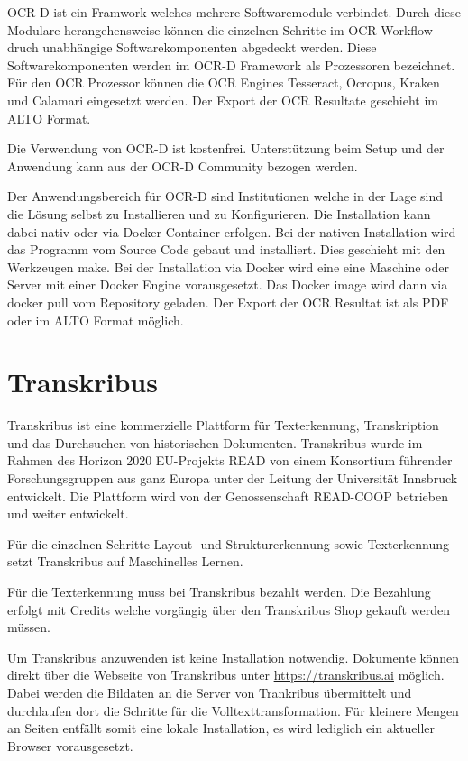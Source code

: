 \documentclass[a4paper,oneside, 12pt]{report}
\begin{document}
OCR-D ist ein Framwork welches mehrere Softwaremodule verbindet. Durch diese Modulare herangehensweise können die einzelnen Schritte im OCR Workflow druch unabhängige Softwarekomponenten abgedeckt werden. Diese Softwarekomponenten werden im OCR-D Framework als Prozessoren bezeichnet. Für den \ac{OCR} Prozessor können die OCR Engines Tesseract, Ocropus, Kraken und Calamari eingesetzt werden. Der Export der OCR Resultate geschieht im ALTO Format.

Die Verwendung von OCR-D ist kostenfrei. Unterstützung beim Setup und der Anwendung kann aus der OCR-D Community bezogen werden. 

Der Anwendungsbereich für OCR-D sind Institutionen welche in der Lage sind die Lösung selbst zu Installieren und zu Konfigurieren. Die Installation kann dabei nativ oder via Docker Container erfolgen. Bei der nativen Installation wird das Programm vom Source Code gebaut und installiert. Dies geschieht mit den Werkzeugen make. Bei der Installation via Docker wird eine eine Maschine oder Server mit einer Docker Engine vorausgesetzt. Das Docker image wird dann via docker pull vom Repository geladen. Der Export der OCR Resultat ist als PDF oder im ALTO Format möglich.
\section{Transkribus}
Transkribus ist eine kommerzielle Plattform für Texterkennung, Transkription und das Durchsuchen von historischen Dokumenten. Transkribus wurde im Rahmen des Horizon 2020 EU-Projekts READ von einem Konsortium führender Forschungsgruppen aus ganz Europa unter der Leitung der Universität Innsbruck entwickelt. Die Plattform wird von der Genossenschaft READ-COOP betrieben und weiter entwickelt. \cite{readcoopabout} 

Für die einzelnen Schritte Layout- und Strukturerkennung sowie Texterkennung setzt Transkribus auf Maschinelles Lernen. \cite{transkribus}

Für die Texterkennung muss bei Transkribus bezahlt werden. Die Bezahlung erfolgt mit Credits welche vorgängig über den Transkribus Shop gekauft werden müssen. \cite{transkribuspricing}

Um Transkribus anzuwenden ist keine Installation notwendig. Dokumente können direkt über die Webseite von Transkribus unter \url{https://transkribus.ai} möglich. Dabei werden die Bildaten an die Server von Trankribus übermittelt und durchlaufen dort die Schritte für die Volltexttransformation. Für kleinere Mengen an Seiten entfällt somit eine lokale Installation, es wird lediglich ein aktueller Browser vorausgesetzt.
\end{document}
